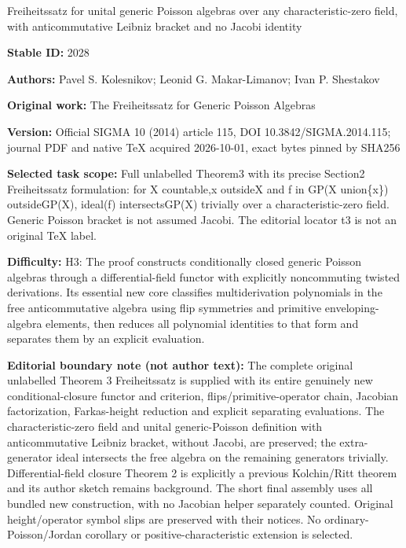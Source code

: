\documentclass[11pt]{article}
\begin{document}
\begin{center}\Large Freiheitssatz for unital generic Poisson algebras over any characteristic-zero field, with anticommutative Leibniz bracket and no Jacobi identity\end{center}
\noindent\textbf{Stable ID:} 2028\par
\noindent\textbf{Authors:} Pavel S. Kolesnikov; Leonid G. Makar-Limanov; Ivan P. Shestakov\par
\noindent\textbf{Original work:} The Freiheitssatz for Generic Poisson Algebras\par
\noindent\textbf{Version:} Official SIGMA 10 (2014) article 115, DOI 10.3842/SIGMA.2014.115; journal PDF and native TeX acquired 2026-10-01, exact bytes pinned by SHA256\par
\noindent\textbf{Selected task scope:} Full unlabelled Theorem3 with its precise Section2 Freiheitssatz formulation: for X countable,x outsideX and f in GP(X union\{x\}) outsideGP(X), ideal(f) intersectsGP(X) trivially over a characteristic-zero field. Generic Poisson bracket is not assumed Jacobi. The editorial locator t3 is not an original TeX label.\par
\noindent\textbf{Difficulty:} H3: The proof constructs conditionally closed generic Poisson algebras through a differential-field functor with explicitly noncommuting twisted derivations. Its essential new core classifies multiderivation polynomials in the free anticommutative algebra using flip symmetries and primitive enveloping-algebra elements, then reduces all polynomial identities to that form and separates them by an explicit evaluation.\par
\noindent\textbf{Editorial boundary note (not author text):} The complete original unlabelled Theorem 3 Freiheitssatz is supplied with its entire genuinely new conditional-closure functor and criterion, flips/primitive-operator chain, Jacobian factorization, Farkas-height reduction and explicit separating evaluations. The characteristic-zero field and unital generic-Poisson definition with anticommutative Leibniz bracket, without Jacobi, are preserved; the extra-generator ideal intersects the free algebra on the remaining generators trivially. Differential-field closure Theorem 2 is explicitly a previous Kolchin/Ritt theorem and its author sketch remains background. The short final assembly uses all bundled new construction, with no Jacobian helper separately counted. Original height/operator symbol slips are preserved with their notices. No ordinary-Poisson/Jordan corollary or positive-characteristic extension is selected.\par
\end{document}
